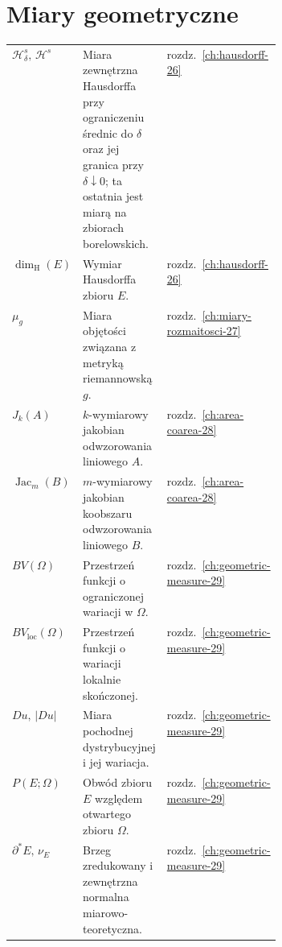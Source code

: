 \section*{Miary geometryczne}
\begin{longtable}{@{}>{\raggedright\arraybackslash}p{0.285\linewidth}>{\raggedright\arraybackslash}p{}>{\raggedleft\arraybackslash}p{0.11\linewidth}@{}}
$\mathcal H^s_\delta,\,\mathcal H^s$ & Miara zewnętrzna Hausdorffa przy ograniczeniu średnic do $\delta$ oraz jej granica przy $\delta\downarrow0$; ta ostatnia jest miarą na zbiorach borelowskich. & rozdz.~\ref{ch:hausdorff-26} \\
$\dim_{\mathrm H}(E)$ & Wymiar Hausdorffa zbioru $E$. & rozdz.~\ref{ch:hausdorff-26} \\
$\mu_g$ & Miara objętości związana z metryką riemannowską $g$. & rozdz.~\ref{ch:miary-rozmaitosci-27} \\
$J_k(A)$ & $k$-wymiarowy jakobian odwzorowania liniowego $A$. & rozdz.~\ref{ch:area-coarea-28} \\
$\operatorname{Jac}_m(B)$ & $m$-wymiarowy jakobian koobszaru odwzorowania liniowego $B$. & rozdz.~\ref{ch:area-coarea-28} \\
$BV(\Omega)$ & Przestrzeń funkcji o ograniczonej wariacji w $\Omega$. & rozdz.~\ref{ch:geometric-measure-29} \\
$BV_{\mathrm{loc}}(\Omega)$ & Przestrzeń funkcji o wariacji lokalnie skończonej. & rozdz.~\ref{ch:geometric-measure-29} \\
$Du,\,|Du|$ & Miara pochodnej dystrybucyjnej i jej wariacja. & rozdz.~\ref{ch:geometric-measure-29} \\
$P(E;\Omega)$ & Obwód zbioru $E$ względem otwartego zbioru $\Omega$. & rozdz.~\ref{ch:geometric-measure-29} \\
$\partial^*E,\,\nu_E$ & Brzeg zredukowany i zewnętrzna normalna miarowo-teoretyczna. & rozdz.~\ref{ch:geometric-measure-29} \\
\end{longtable}

